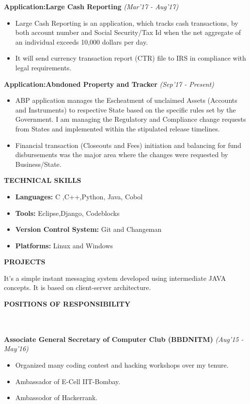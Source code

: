 \documentclass[a4paper,10pt]{article}
\newcommand{\resheading}[1]{{\small \colorbox{mygrey}{\begin{minipage}{0.975\textwidth}{\textbf{#1 \vphantom{p\^{E}}}}\end{minipage} \hspace{0.2cm}}}}
\begin{document}
\indent\small{\textbf{Application:Large Cash Reporting}	\hfill	\small{\textit{(Mar'17 - Aug'17)}}
\begin{itemize}
 \item Large Cash Reporting is an application, which tracks cash transactions, by both account number and Social Security/Tax Id when the net aggregate of an individual exceeds 10,000 dollars per day.
 \item It will send currency transaction report (CTR) file to IRS in compliance with legal requirements.
\end{itemize}

\indent\small{\textbf{Application:Abndoned Property and Tracker}	\hfill	\small{\textit{(Sep'17 - Present)}}
\begin{itemize}
 \item ABP application manages the Escheatment of unclaimed Assets (Accounts and Instruments) to respective State based on the specific rules set by the Government. I am managing the Regulatory and Compliance change requests from States and implemented within the stipulated release timelines.
 \item Financial transaction (Closeouts and Fees) initiation and balancing for fund disbursements was the major area where the changes were requested by Business/State.
\end{itemize}

\resheading{TECHNICAL SKILLS} 
    \begin{itemize}
\item \textbf{Languages:\space} C ,\space C++,\space Python, \space Java, \space Cobol
\item \textbf{Tools:} Eclipse,\space Django\space, Codeblocks\space
\item \textbf{Version Control System:} Git and Changeman
\item \textbf{Platforms:} Linux and Windows
    \end{itemize}
    
    
\resheading{PROJECTS}
\begin{itemize}
  \item\indent\small{\textbf{Instant Messenger}	\hfill	\small{\textit{(July'18 - Present)}}
  \end{itemize}
  
It's a simple instant messaging system developed using intermediate JAVA concepts. It is based on client-server architecture.
    
\resheading{POSITIONS OF RESPONSIBILITY}
\\ \\
\indent\small{\textbf{Associate General Secretary of Computer Club (BBDNITM)}}	\hfill	\small{\textit{(Aug'15 - May'16)}}
\begin{itemize}
 \item Organized many coding contest and hacking workshops over my tenure.
 \item Ambassador of E-Cell IIT-Bombay.
 \item Ambassodor of Hackerrank.
\end{itemize}


}}
\end{document}

